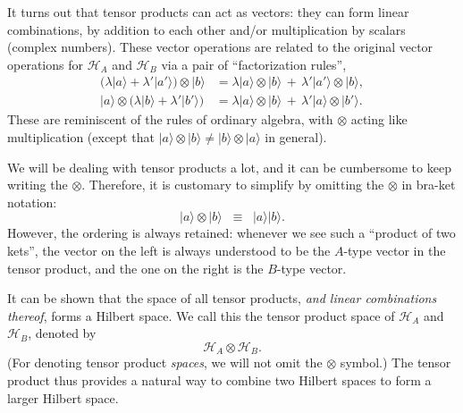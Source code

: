 \documentclass[pra,12pt]{revtex4-2}
\begin{document}
It turns out that tensor products can act as vectors: they can form
linear combinations, by addition to each other and/or multiplication
by scalars (complex numbers).  These vector operations are related to
the original vector operations for $\mathscr{H}_A$ and $\mathscr{H}_B$
via a pair of ``factorization rules'',
\begin{align}
  \Big(\lambda |a\rangle
  + \lambda' |a'\rangle\Big) \otimes |b\rangle &=
  \lambda |a\rangle \otimes |b\rangle \,+\,
  \lambda' |a'\rangle \otimes |b\rangle, \label{tensorrule1} \\
  |a\rangle \otimes \Big(\lambda |b\rangle
  + \lambda' |b'\rangle\Big) &=
  \lambda |a\rangle \otimes |b\rangle \,+\,
  \lambda' |a\rangle \otimes |b'\rangle.
  \label{tensorrule2} 
\end{align}
These are reminiscent of the rules of ordinary algebra, with $\otimes$
acting like multiplication (except that $|a\rangle\otimes|b\rangle \ne
|b\rangle\otimes|a\rangle$ in general).

We will be dealing with tensor products a lot, and it can be
cumbersome to keep writing the $\otimes$.  Therefore, it is customary
to simplify by omitting the $\otimes$ in bra-ket notation:
\begin{equation}
  |a \rangle \otimes |b\rangle \;\; \equiv \;\; |a \rangle |b\rangle.
\end{equation}
However, the ordering is always retained: whenever we see such a
``product of two kets'', the vector on the left is always understood
to be the $A$-type vector in the tensor product, and the one on the
right is the $B$-type vector.

It can be shown that the space of all tensor products, \textit{and
  linear combinations thereof}, forms a Hilbert space.  We call this
the tensor product space of $\mathscr{H}_A$ and $\mathscr{H}_B$,
denoted by
\begin{equation*}
  \mathscr{H}_A\otimes \mathscr{H}_B.
\end{equation*}
(For denoting tensor product \textit{spaces}, we will not omit the
$\otimes$ symbol.)  The tensor product thus provides a natural way to combine two Hilbert spaces to form a larger Hilbert space.
\end{document}
